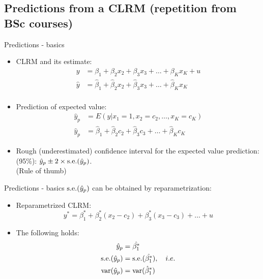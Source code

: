 \documentclass{beamer}
\begin{document}
\subsection{Predictions from a CLRM (repetition from BSc courses)}
\begin{frame}{Predictions - basics}
\begin{itemize}
\item CLRM and its estimate:
\begin{align}\nonumber
y & = \beta_1 + \beta_2 x_2 +\beta_3 x_3 + \dots + \beta_K x_K + u\\ \nonumber
\hat{y} & = \hat{\beta}_1 + \hat{\beta}_2 x_2 +\hat{\beta}_3 x_3 + \dots + \hat{\beta}_K x_K \\ \nonumber
\end{align}
\item Prediction of expected value: 
\begin{align}\nonumber
\hat{y}_p & = E(y|x_1 = 1, x_2 = c_2,\dots,x_K = c_K)\\ \nonumber
\hat{y}_p & = \hat{\beta}_1 + \hat{\beta}_2 c_2 +\hat{\beta}_3 c_3 + \dots + \hat{\beta}_K c_K  \nonumber
\end{align}
\item Rough (underestimated) confidence interval for the expected value prediction: (95\%): $\hat{y}_p \pm 2 \times \textnormal{s.e.}(\hat{y}_p)$. \\ (Rule of thumb) 
\end{itemize}
\end{frame}


\begin{frame}{Predictions - basics}
$\textnormal{s.e.}(\hat{y}_p)$ can be obtained by reparametrization:

\vspace{0.5cm}
\begin{itemize}
\item Reparametrized CLRM:
$$y^*=\beta^*_1 + \beta^*_2 (x_2 -c_2) + \beta^*_3(x_3 - c_3) + \dots + u$$
\item The following holds:
\begin{align} \nonumber
 \hat{y}_p &= \hat{\beta_1^*} \\ \nonumber
 \textnormal{s.e.}(\hat{y}_p ) &= 
   \textnormal{s.e.}(\hat{\beta_1^*}), \quad i.e. \\ \nonumber
 \textnormal{var}(\hat{y}_p) &= \textnormal{var}(\hat{\beta}_1^*)
\end{align} 
\end{itemize}
\end{frame}
\end{document}
